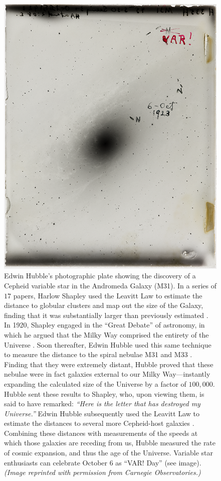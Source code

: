 \begin{figure}
    \centering
    \includegraphics[width=\textwidth,trim={0 5cm 0 2cm},clip]{pics/var3.png}
    \caption[VAR! Day]{Edwin Hubble's photographic plate showing the discovery of a Cepheid variable star in the Andromeda Galaxy (M31). 
    In a series of $17$ papers, Harlow Shapley used the Leavitt Law to estimate the distance to globular clusters and map out the size of the Galaxy, finding that it was substantially larger than previously estimated \citep{1918ApJ....48...89S}. 
    In 1920, Shapley engaged in the ``Great Debate'' of astronomy, in which he argued that the Milky Way comprised the entirety of the Universe \citep{1921BuNRC...2..171S}. 
    Soon thereafter, Edwin Hubble used this same technique to measure the distance to the spiral nebulae M31 and M33 \citep[][see image]{1925Obs....48..139H}. 
    Finding that they were extremely distant, Hubble proved that these nebulae were in fact galaxies external to our Milky Way---instantly expanding the calculated size of the Universe by a factor of $100,000$. 
    Hubble sent these results to Shapley, who, upon viewing them, is said to have remarked: \emph{``Here is the letter that has destroyed my Universe.''} 
    Edwin Hubble subsequently used the Leavitt Law to estimate the distances to several more Cepheid-host galaxies \citep{1929PNAS...15..168H}. 
    Combining these distances with measurements of the speeds at which those galaxies are receding from us, Hubble measured the rate of cosmic expansion, and thus the age of the Universe. 
    Variable star enthusiasts can celebrate October 6 as ``VAR! Day'' (see image). 
    \emph{(Image reprinted with permission from Carnegie Observatories.)}
    \label{fig:var-day}}
\end{figure}

